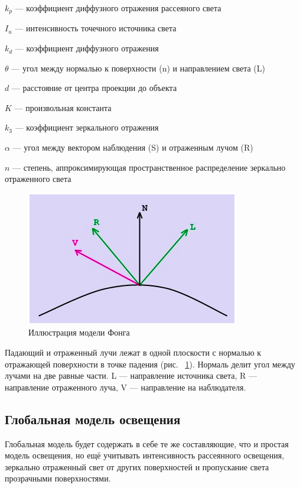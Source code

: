 	$k_{p}$ --- коэффициент диффузного отражения рассеяного света
	
	$I_{u}$ --- интенсивность точечного источника света
	
	$k_{d}$ --- коэффициент диффузного отражения
	
	$\theta$ --- угол между нормалью к поверхности (n) и направлением света (L)
	
	$d$ --- расстояние от центра проекции до объекта
	
	$K$ --- произвольная константа
	
	$k_{3}$ --- коэффициент зеркального отражения
	
	$\alpha$ --- угол между вектором наблюдения (S) и отраженным лучом (R)
	
	$n$ --- степень, аппроксимирующая пространственное распределение зеркально отраженного света


\begin{figure}[h]
	\centering
	\includegraphics[width=0.7\linewidth]{images/screenshot002}
	\caption{Иллюстрация модели Фонга}
	\label{fig:screenshot002}
\end{figure}

Падающий и отраженный лучи лежат в одной плоскости с нормалью к отражающей поверхности в точке падения (рис. ~\ref{fig:screenshot002}). Нормаль делит угол между лучами на две равные части. L --– направление источника света, R --– направление отраженного луча, V --– направление на наблюдателя.

\subsection* {Глобальная модель освещения}

Глобальная модель будет содержать в себе те же составляющие, что и простая модель освещения, но ещё учитывать интенсивность рассеянного освещения, зеркально отраженный свет от других поверхностей и пропускание света прозрачными поверхностями.

